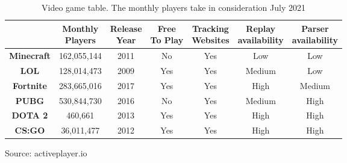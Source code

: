	\begin{table}[!h]
	
		\centering
		
		\caption{\label{tab:Game players table}Video game table. The monthly players take in consideration July 2021}
		
		\begin{tabular}{|c|c|c|c|c|c|c|}
			
			\hline
			 & \makecell{\textbf{{\footnotesize Monthly}} \\ \textbf{{\footnotesize Players}}} & \makecell{\textbf{{\footnotesize Release}} \\ \textbf{{\footnotesize Year}}} & \makecell{\textbf{{\footnotesize Free}} \\ \textbf{{\footnotesize To Play}}} & 
			 \makecell{\textbf{{\footnotesize Tracking}} \\ \textbf{{\footnotesize Websites}}} & \makecell{\textbf{{\footnotesize Replay}} \\ \textbf{{\footnotesize availability}}} & \makecell{\textbf{{\footnotesize Parser}} \\ \textbf{\footnotesize availability}}} \\			
			\hline
			\textbf{{\footnotesize Minecraft}} & {\footnotesize 162,055,144} & {\footnotesize 2011} & {\footnotesize No} & {\footnotesize Yes} & {\footnotesize Low} & {\footnotesize Low} \\
			\hline
			\textbf{{\footnotesize LOL}} & {\footnotesize 128,014,473} & {\footnotesize 2009} & {\footnotesize Yes} & {\footnotesize Yes} & {\footnotesize Medium} & {\footnotesize Low}\\
			\hline
			\textbf{{\footnotesize Fortnite}} & {\footnotesize 283,665,016} & {\footnotesize 2017} & {\footnotesize Yes} & {\footnotesize Yes} & {\footnotesize High} & {\footnotesize Medium}\\
			\hline
			\textbf{{\footnotesize PUBG}} & {\footnotesize 530,844,730} & {\footnotesize 2016} & {\footnotesize No} & {\footnotesize Yes} & {\footnotesize Medium} & {\footnotesize High}\\
			\hline
			\textbf{{\footnotesize DOTA 2}} & {\footnotesize 460,661} & {\footnotesize 2013} & {\footnotesize Yes} & {\footnotesize Yes} & {\footnotesize High} & {\footnotesize High}\\
			\hline
			\rowcolor{Gray}
			\textbf{{\footnotesize CS:GO}} & {\footnotesize 36,011,477} & {\footnotesize 2012} & {\footnotesize Yes} & {\footnotesize Yes} & {\footnotesize High} & {\footnotesize High}\\
			\hline

		\end{tabular}
	
	\end{table}
	Source: activeplayer.io\cite{site:activePlayerLOL}\cite{site:activePlayerFortnite}\cite{site:activePlayerPUBG}\cite{site:activePlayerMinecraft}\cite{site:activePlayersDota}\cite{site:activePlayersCSGO}
	
